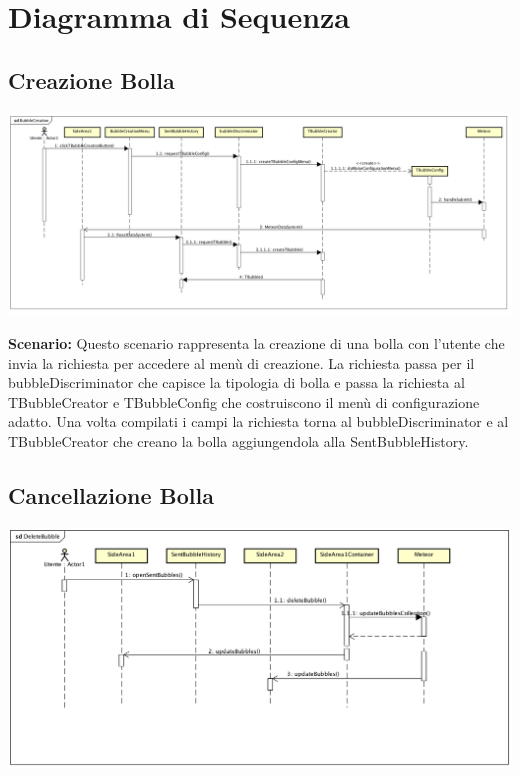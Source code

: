 \section{Diagramma di Sequenza}

\subsection{Creazione Bolla}

\begin{center}
	\includegraphics[scale=0.33]{img/CreationBubble.png}
\end{center}

\newpage

\textbf{Scenario:} 
Questo scenario rappresenta la creazione di una bolla con l’utente che
invia la richiesta per 	accedere al menù di creazione. La richiesta
passa per il bubbleDiscriminator che capisce la 	tipologia di bolla
e passa la richiesta al TBubbleCreator e TBubbleConfig che
costruiscono il 	menù di configurazione adatto.  
Una volta compilati i campi la richiesta torna al bubbleDiscriminator e al TBubbleCreator che 	creano la bolla aggiungendola alla SentBubbleHistory. \\

\subsection{Cancellazione Bolla}

\begin{center}
	\includegraphics[scale=0.36]{img/DeleteBubble.png}
\end{center}



